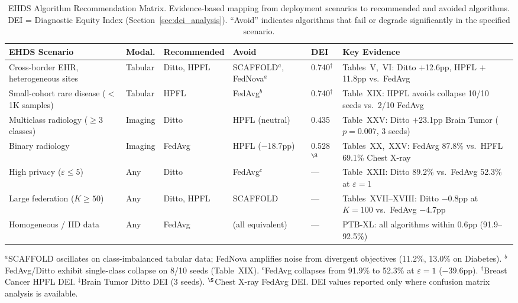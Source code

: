 \documentclass[conference,a4paper]{IEEEtran}
\begin{document}
\begin{table}[htbp]
\centering
\caption{EHDS Algorithm Recommendation Matrix. Evidence-based mapping from deployment scenarios to recommended and avoided algorithms. DEI = Diagnostic Equity Index (Section~\ref{sec:dei_analysis}). ``Avoid'' indicates algorithms that fail or degrade significantly in the specified scenario.}
\label{tab:algo_recommendation}
\small
\begin{tabular}{p{3.2cm}p{1.2cm}p{2.0cm}p{2.5cm}p{0.8cm}p{4.8cm}}
\toprule
\textbf{EHDS Scenario} & \textbf{Modal.} & \textbf{Recommended} & \textbf{Avoid} & \textbf{DEI} & \textbf{Key Evidence} \\
\midrule
Cross-border EHR, heterogeneous sites & Tabular & Ditto, HPFL & SCAFFOLD$^a$, FedNova$^a$ & 0.740$^\dagger$ & Tables~V,~VI: Ditto $+$12.6pp, HPFL $+$11.8pp vs.\ FedAvg \\
\addlinespace
Small-cohort rare disease ($<$1K samples) & Tabular & HPFL & FedAvg$^b$ & 0.740$^\dagger$ & Table~XIX: HPFL avoids collapse 10/10 seeds vs.\ 2/10 FedAvg \\
\addlinespace
Multiclass radiology ($\geq$3 classes) & Imaging & Ditto & HPFL (neutral) & 0.435 & Table~XXV: Ditto $+$23.1pp Brain Tumor ($p{=}0.007$, 3 seeds) \\
\addlinespace
Binary radiology & Imaging & FedAvg & HPFL ($-$18.7pp) & 0.528$^\S$ & Tables~XX,~XXV: FedAvg 87.8\% vs.\ HPFL 69.1\% Chest X-ray \\
\addlinespace
High privacy ($\varepsilon \leq 5$) & Any & Ditto & FedAvg$^c$ & --- & Table~XXII: Ditto 89.2\% vs.\ FedAvg 52.3\% at $\varepsilon{=}1$ \\
\addlinespace
Large federation ($K \geq 50$) & Any & Ditto, HPFL & SCAFFOLD & --- & Tables~XVII--XVIII: Ditto $-$0.8pp at $K{=}100$ vs.\ FedAvg $-$4.7pp \\
\addlinespace
Homogeneous / IID data & Any & FedAvg & (all equivalent) & --- & PTB-XL: all algorithms within 0.6pp (91.9--92.5\%) \\
\bottomrule
\end{tabular}

\vspace{1mm}
\footnotesize{$^a$SCAFFOLD oscillates on class-imbalanced tabular data; FedNova amplifies noise from divergent objectives (11.2\%, 13.0\% on Diabetes). $^b$FedAvg/Ditto exhibit single-class collapse on 8/10 seeds (Table~XIX). $^c$FedAvg collapses from 91.9\% to 52.3\% at $\varepsilon{=}1$ ($-$39.6pp). $^\dagger$Breast Cancer HPFL DEI. $^\ddagger$Brain Tumor Ditto DEI (3 seeds). $^\S$Chest X-ray FedAvg DEI. DEI values reported only where confusion matrix analysis is available.}
\end{table}
\end{document}
